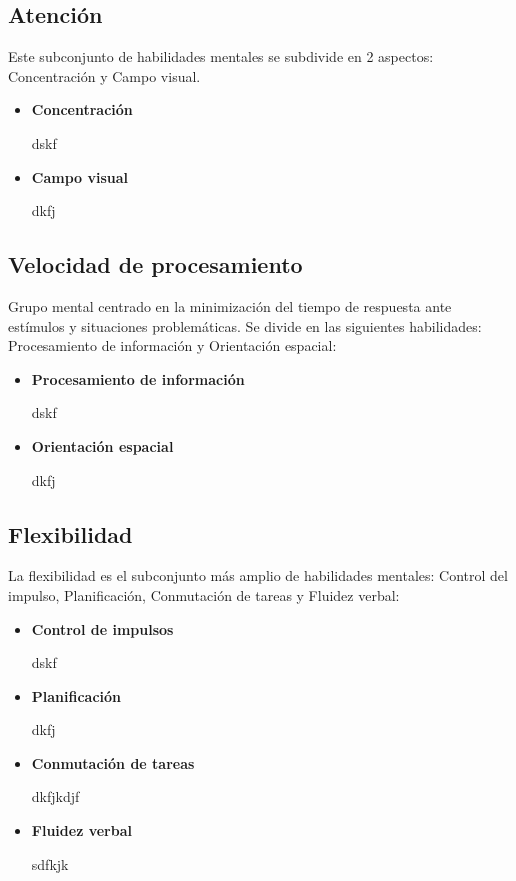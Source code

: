 \subsection*{Atención}

Este subconjunto de habilidades mentales se subdivide en 2 aspectos: Concentración y Campo visual.


\begin{itemize}

\item {\bf Concentración}

dskf

\item {\bf Campo visual}

dkfj

\end{itemize}

\subsection*{Velocidad de procesamiento}

Grupo mental centrado en la minimización del tiempo de respuesta ante estímulos y situaciones problemáticas. Se divide en las siguientes habilidades: Procesamiento de información y Orientación espacial:

\begin{itemize}

\item {\bf Procesamiento de información}

dskf

\item {\bf Orientación espacial}

dkfj

\end{itemize}

\subsection*{Flexibilidad}

La flexibilidad es el subconjunto más amplio de habilidades mentales: Control del impulso, Planificación, Conmutación de tareas y Fluidez verbal:

\begin{itemize}

\item {\bf Control de impulsos}

dskf

\item {\bf Planificación}

dkfj

\item {\bf Conmutación de tareas}

dkfjkdjf

\item {\bf Fluidez verbal}

sdfkjk

\end{itemize}

